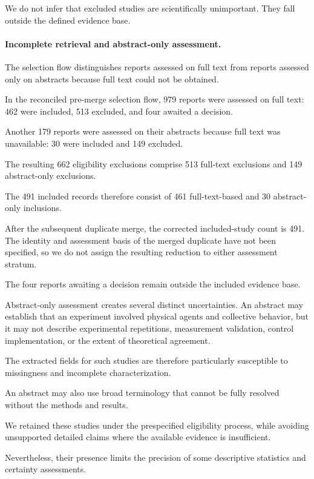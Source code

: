 We do not infer
that excluded
studies are
scientifically
unimportant.
They fall outside
the defined
evidence base.

\paragraph*{Incomplete retrieval and abstract-only assessment.}

The selection flow distinguishes
reports assessed on full text
from reports assessed only
on abstracts because full
text could not be obtained.

In the reconciled
pre-merge selection flow,
979 reports were
assessed on full text:
462 were included,
513 excluded,
and four awaited
a decision.

Another 179 reports
were assessed on
their abstracts
because full text
was unavailable:
30 were included
and 149 excluded.

The resulting
662 eligibility
exclusions comprise
513 full-text
exclusions and
149 abstract-only
exclusions.

The 491 included records
therefore consist
of 461 full-text-based
and 30 abstract-only
inclusions.

After the subsequent
duplicate merge,
the corrected
included-study count
is 491.
The identity and
assessment basis
of the merged
duplicate have not
been specified,
so we do not
assign the resulting
reduction to either
assessment stratum.

The four reports
awaiting a decision
remain outside
the included
evidence base.

Abstract-only assessment
creates several
distinct uncertainties.
An abstract may
establish that an
experiment involved
physical agents
and collective behavior,
but it may not
describe experimental
repetitions,
measurement validation,
control implementation,
or the extent
of theoretical
agreement.

The extracted fields
for such studies
are therefore
particularly susceptible
to missingness
and incomplete
characterization.

An abstract may also
use broad terminology
that cannot be
fully resolved
without the
methods and results.

We retained these
studies under
the prespecified
eligibility process,
while avoiding
unsupported detailed
claims where the
available evidence
is insufficient.

Nevertheless,
their presence
limits the precision
of some descriptive
statistics and
certainty assessments.


